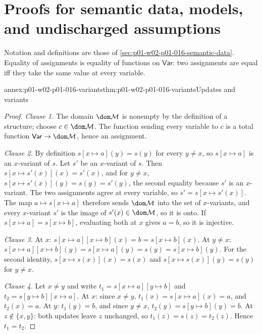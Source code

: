 \section{Proofs for semantic data, models, and undischarged assumptions}
\label{sec:annex-p01-w02-p01-016-semantic-data}

Notation and definitions are those of
\cref{sec:p01-w02-p01-016-semantic-data}. Equality of assignments is
equality of functions on \(\mathsf{Var}\): two assignments are equal iff they
take the same value at every variable.

\begin{annexitem}{annex:p01-w02-p01-016-variants}{thm:p01-w02-p01-016-variants}{Updates and variants}
\begin{proof}
\emph{Clause 1.} The domain \(\dom\mathcal M\) is nonempty by the definition
of a structure; choose \(c\in\dom\mathcal M\). The function sending every
variable to \(c\) is a total function \(\mathsf{Var}\to\dom\mathcal M\),
hence an assignment.

\emph{Clause 2.} By definition \(s[x\mapsto a](y)=s(y)\) for every
\(y\ne x\), so \(s[x\mapsto a]\) is an \(x\)-variant of \(s\). Let \(s'\) be
an \(x\)-variant of \(s\). Then \(s[x\mapsto s'(x)](x)=s'(x)\), and for
\(y\ne x\), \(s[x\mapsto s'(x)](y)=s(y)=s'(y)\), the second equality because
\(s'\) is an \(x\)-variant. The two assignments agree at every variable, so
\(s'=s[x\mapsto s'(x)]\). The map \(a\mapsto s[x\mapsto a]\) therefore sends
\(\dom\mathcal M\) into the set of \(x\)-variants, and every \(x\)-variant
\(s'\) is the image of \(s'(x)\in\dom\mathcal M\), so it is onto. If
\(s[x\mapsto a]=s[x\mapsto b]\), evaluating both at \(x\) gives \(a=b\), so it
is injective.

\emph{Clause 3.} At \(x\): \(s[x\mapsto a][x\mapsto b](x)=b=s[x\mapsto b](x)\).
At \(y\ne x\): \(s[x\mapsto a][x\mapsto b](y)=s[x\mapsto a](y)=s(y)
=s[x\mapsto b](y)\). For the second identity, \(s[x\mapsto s(x)](x)=s(x)\)
and \(s[x\mapsto s(x)](y)=s(y)\) for \(y\ne x\).

\emph{Clause 4.} Let \(x\ne y\) and write \(t_1=s[x\mapsto a][y\mapsto b]\)
and \(t_2=s[y\mapsto b][x\mapsto a]\). At \(x\): since \(x\ne y\),
\(t_1(x)=s[x\mapsto a](x)=a\), and \(t_2(x)=a\). At \(y\): \(t_1(y)=b\), and
since \(y\ne x\), \(t_2(y)=s[y\mapsto b](y)=b\). At \(z\notin\{x,y\}\): both
updates leave \(z\) unchanged, so \(t_1(z)=s(z)=t_2(z)\). Hence \(t_1=t_2\).
\end{proof}
\end{annexitem}

